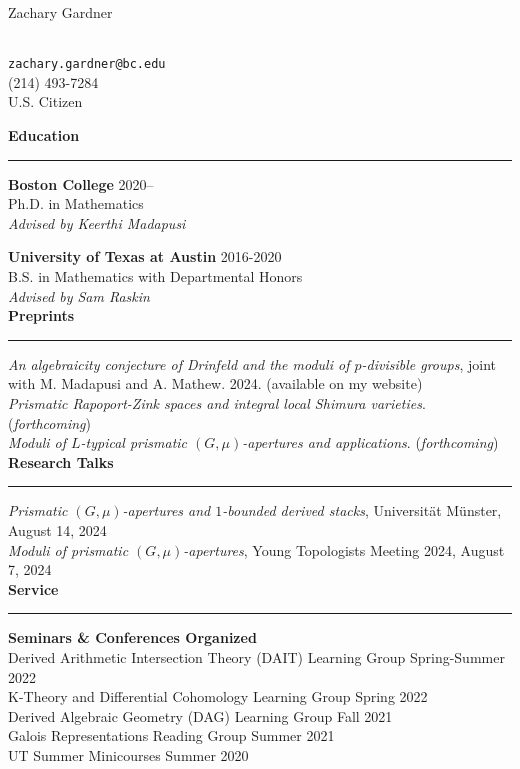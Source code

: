 \documentclass[11pt]{article}
\newenvironment{mysection}{
\color{mygreen}\bfseries\large
}
{
\\ \rule{\textwidth}{1pt}\hspace{-.25em}
} %
\begin{document}
\begin{center}
\begin{LARGE}Zachary Gardner\end{LARGE} \\
\vspace{1em}
\texttt{zachary.gardner@bc.edu} \\
(214) 493-7284 \\
U.S. Citizen \\
\end{center}

\begin{mysection}Education\end{mysection}
\textbf{Boston College} \hfill 2020-- \\
Ph.D. in Mathematics \\
\textit{Advised by Keerthi Madapusi}

\textbf{University of Texas at Austin} \hfill 2016-2020 \\
B.S. in Mathematics with Departmental Honors \\
\textit{Advised by Sam Raskin} \\

\begin{mysection}Preprints\end{mysection}
\!\!\textit{An algebraicity conjecture of Drinfeld and the moduli of $p$-divisible groups}, joint with M. Madapusi and A. Mathew. 2024. (available on my website) \\
\textit{Prismatic Rapoport-Zink spaces and integral local Shimura varieties}. (\textit{forthcoming}) \\
\textit{Moduli of $L$-typical prismatic $(G,\mu)$-apertures and applications}. (\textit{forthcoming}) \\

\begin{mysection}Research Talks\end{mysection}
\textit{Prismatic $(G,\mu)$-apertures and $1$-bounded derived stacks}, Universit\"{a}t M\"{u}nster, August 14, 2024 \\
\textit{Moduli of prismatic $(G,\mu)$-apertures}, Young Topologists Meeting 2024, August 7, 2024 \\

\begin{mysection}Service \end{mysection}
\textbf{Seminars \& Conferences Organized} \\
Derived Arithmetic Intersection Theory (DAIT) Learning Group \hfill Spring-Summer 2022 \\
K-Theory and Differential Cohomology Learning Group \hfill Spring 2022 \\
Derived Algebraic Geometry (DAG) Learning Group \hfill Fall 2021 \\
Galois Representations Reading Group \hfill Summer 2021 \\
UT Summer Minicourses \hfill Summer 2020
\end{document}
